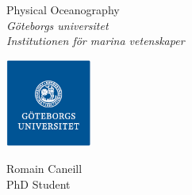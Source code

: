 \documentclass[12pt,a4paper]{article}
\begin{document}
\setlength{\parindent}{0pt}

\thispagestyle{empty}

\begin{minipage}{0.4\paperwidth}
  {\sc Physical Oceanography} \\
{\it Göteborgs universitet}\\
{\it Institutionen för marina vetenskaper}
\end{minipage}
\begin{minipage}{0.3\paperwidth}
  \includegraphics[height=2.9cm]{gu}
\end{minipage}
\begin{minipage}{0.2\paperwidth}
  Romain Caneill\\
  PhD Student
\end{minipage}
\end{document}
